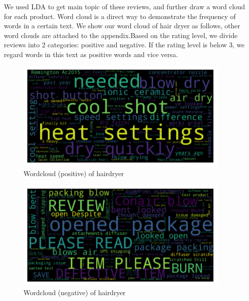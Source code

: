 \documentclass{mcmthesis}
\begin{document}
We used LDA to get main topic of these reviews, and further draw a word cloud for each product. Word cloud is a direct way to demonstrate the frequency of words in a certain text. We show our word cloud of hair dryer as follows, other word clouds are attached to the appendix.Based on the rating level, we divide reviews into 2 categories: positive and negative. If the rating level is below 3, we regard words in this text as positive words and vice versa.\par
\begin{figure}[htbp]
\centering
\includegraphics[width=10.5cm]{./figures/hairdryer_good.png}
\caption{Wordcloud (positive) of hairdryer}
\end{figure}
\begin{figure}[htbp]
\centering
\includegraphics[width=10.5cm]{./figures/hairdryer_bad.png}
\caption{Wordcloud (negative) of hairdryer}
\end{figure}
\end{document}
